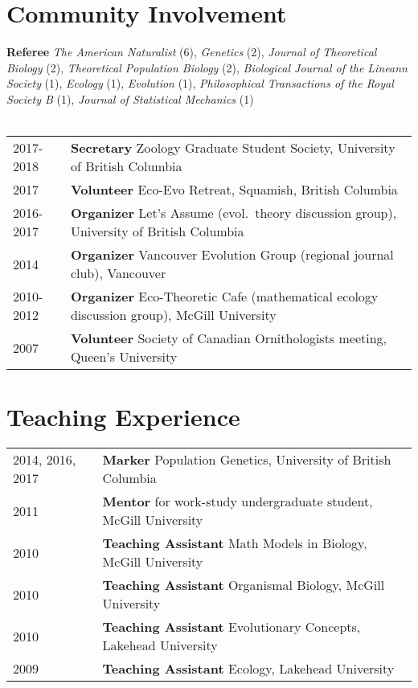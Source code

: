 \documentclass[12pt]{article}
\begin{document}
\section*{Community Involvement}

\noindent \textbf{Referee} \textit{The American Naturalist} (6), \textit{Genetics} (2), \textit{Journal of Theoretical Biology} (2), \textit{Theoretical Population Biology} (2), \textit{Biological Journal of the Lineann Society} (1), \textit{Ecology} (1), \textit{Evolution} (1), \textit{Philosophical Transactions of the Royal Society B} (1), \textit{Journal of Statistical Mechanics} (1) \\\\
\begin{tabular}{ll}
2017-2018 & \textbf{Secretary} Zoology Graduate Student Society, University of British Columbia \\
2017 & \textbf{Volunteer} Eco-Evo Retreat, Squamish, British Columbia \\
2016-2017 & \textbf{Organizer} Let's Assume (evol.\ theory discussion group), University of British Columbia \\
2014 & \textbf{Organizer} Vancouver Evolution Group (regional journal club), Vancouver \\
2010-2012 & \textbf{Organizer} Eco-Theoretic Cafe (mathematical ecology discussion group), McGill University \\
2007 & \textbf{Volunteer} Society of Canadian Ornithologists meeting,  Queen's University
\end{tabular}

\section*{Teaching Experience}

\begin{tabular}{ll}
2014, 2016, 2017 & \textbf{Marker} Population Genetics, University of British Columbia \\
2011 & \textbf{Mentor} for work-study undergraduate student, McGill University \\
2010 & \textbf{Teaching Assistant} Math Models in Biology, McGill University \\
2010 & \textbf{Teaching Assistant} Organismal Biology, McGill University\\
2010 &  \textbf{Teaching Assistant} Evolutionary Concepts, Lakehead University\\
2009 &  \textbf{Teaching Assistant} Ecology, Lakehead University
\end{tabular}
\end{document}

